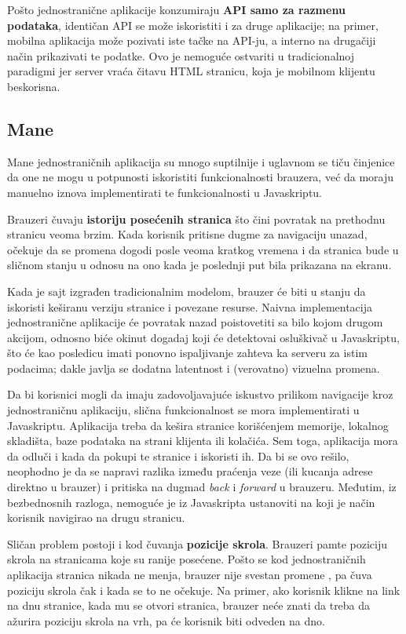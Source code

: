 Pošto jednostranične aplikacije konzumiraju \textbf{API samo za razmenu podataka}, identičan API se može iskoristiti i za druge aplikacije; na primer, mobilna aplikacija može pozivati iste tačke na API-ju, a interno na drugačiji način prikazivati te podatke.
Ovo je nemoguće ostvariti u tradicionalnoj paradigmi jer server vraća čitavu HTML stranicu, koja je mobilnom klijentu beskorisna.

\subsection{Mane}

Mane jednostraničnih aplikacija su mnogo suptilnije i uglavnom se tiču činjenice da one ne mogu u potpunosti iskoristiti funkcionalnosti brauzera, već da moraju manuelno iznova implementirati te funkcionalnosti u Javaskriptu.

Brauzeri čuvaju \textbf{istoriju posećenih stranica} što čini povratak na prethodnu stranicu veoma brzim.
Kada korisnik pritisne dugme za navigaciju unazad, očekuje da se promena dogodi posle veoma kratkog vremena i da stranica bude u sličnom stanju u odnosu na ono kada je poslednji put bila prikazana na ekranu.

Kada je sajt izgrađen tradicionalnim modelom, brauzer će biti u stanju da iskoristi keširanu verziju stranice i povezane resurse.
Naivna implementacija jednostranične aplikacije će povratak nazad poistovetiti sa bilo kojom drugom akcijom, odnosno biće okinut dogadaj koji će detektovai osluškivač u Javaskriptu, što će kao posledicu imati ponovno ispaljivanje zahteva ka serveru za istim podacima; dakle javlja se dodatna latentnost i (verovatno) vizuelna promena.

Da bi korisnici mogli da imaju zadovoljavajuće iskustvo prilikom navigacije kroz jednostraničnu aplikaciju, slična funkcionalnost se mora implementirati u Javaskriptu. Aplikacija treba da kešira stranice korišćenjem memorije, lokalnog skladišta, baze podataka na strani klijenta ili kolačića.
Sem toga, aplikacija mora da odluči i kada da pokupi te stranice i iskoristi ih.
Da bi se ovo rešilo, neophodno je da se napravi razlika između praćenja veze (ili kucanja adrese direktno u brauzer) i pritiska na dugmad \textsl{back} i \textsl{forward} u brauzeru. 
Međutim, iz bezbednosnih razloga, nemoguće je iz Javaskripta ustanoviti na koji je način korisnik navigirao na drugu stranicu.

Sličan problem postoji i kod čuvanja \textbf{pozicije skrola}.
Brauzeri pamte poziciju skrola na stranicama koje su ranije posećene.
Pošto se kod jednostraničnih aplikacija stranica nikada ne menja, brauzer nije svestan promene , pa čuva poziciju skrola čak i kada se to ne očekuje.
Na primer, ako korisnik klikne na link na dnu stranice, kada mu se otvori  stranica, brauzer neće znati da treba da ažurira poziciju skrola na vrh, pa će korisnik biti odveden na dno.

